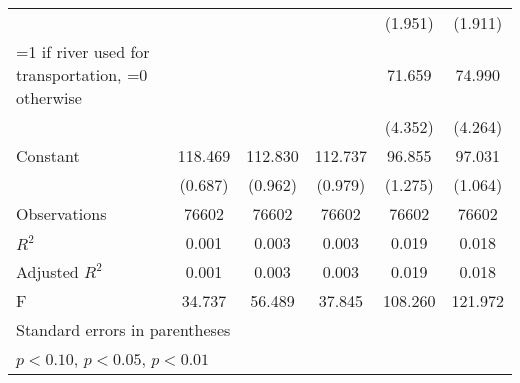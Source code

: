 {\begin{tabular}{l*{5}{c}}
                    &                     &                     &                     &     (1.951)         &     (1.911)         \\
\addlinespace
\hspace{0.25cm} =1 if river used for transportation, =0 otherwise&                     &                     &                     &      71.659\sym{***}&      74.990\sym{***}\\
                    &                     &                     &                     &     (4.352)         &     (4.264)         \\
\addlinespace
Constant            &     118.469\sym{***}&     112.830\sym{***}&     112.737\sym{***}&      96.855\sym{***}&      97.031\sym{***}\\
                    &     (0.687)         &     (0.962)         &     (0.979)         &     (1.275)         &     (1.064)         \\
\midrule
Observations        &       76602         &       76602         &       76602         &       76602         &       76602         \\
\(R^{2}\)           &       0.001         &       0.003         &       0.003         &       0.019         &       0.018         \\
Adjusted \(R^{2}\)  &       0.001         &       0.003         &       0.003         &       0.019         &       0.018         \\
F                   &      34.737         &      56.489         &      37.845         &     108.260         &     121.972         \\
\bottomrule
\multicolumn{6}{l}{\footnotesize Standard errors in parentheses}\\
\multicolumn{6}{l}{\footnotesize \sym{*} \(p<0.10\), \sym{**} \(p<0.05\), \sym{***} \(p<0.01\)}\\
\end{tabular}
}
